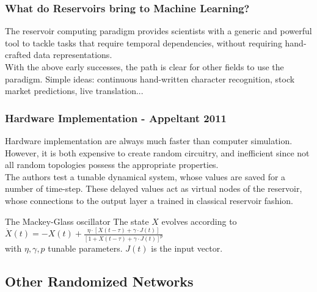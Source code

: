 \documentclass{beamer}
\begin{document}
\begin{frame}
\frametitle{What do Reservoirs bring to Machine Learning?}

The reservoir computing paradigm provides scientists with a generic and powerful tool to tackle tasks that require temporal dependencies, without requiring hand-crafted data representations.\\
\vspace{5mm}
With the above early successes, the path is clear for other fields to use the paradigm. Simple ideas: continuous hand-written character recognition, stock market predictions, live translation...

\end{frame}



\begin{frame}
\frametitle{Hardware Implementation - Appeltant 2011}

Hardware implementation are always much faster than computer simulation. However, it is both expensive to create random circuitry, and inefficient since not all random topologies possess the appropriate properties.\\
\vspace{3mm}
The authors test a tunable dynamical system, whose values are saved for a number of time-step. These delayed values act as virtual nodes of the reservoir, whose connections to the output layer a trained in classical reservoir fashion.

\begin{block}{The Mackey-Glass oscillator}
 The state $X$ evolves according to $\dot X (t) = -X(t) + \frac{\eta \cdot [X(t-\tau) + \gamma \cdot J(t)]}{[1+X(t-\tau) + \gamma \cdot J(t)]^p }$\\
with $\eta, \gamma, p$ tunable parameters. $J(t)$ is the input vector.
\end{block}
\end{frame}

\subsection{Other Randomized Networks}
\end{document}

